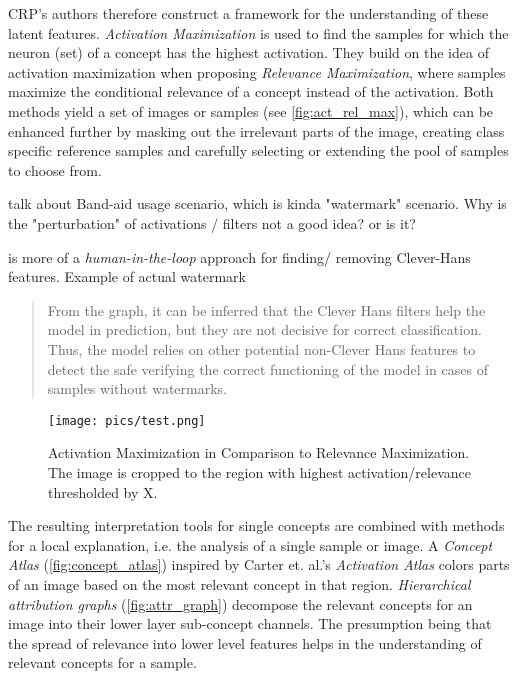 CRP's authors therefore construct a framework for the understanding of these latent features. \textit{Activation Maximization} is used to find the samples for which the neuron (set) of a concept has the highest activation. They build on the idea of activation maximization when proposing \textit{Relevance Maximization}, where samples maximize the conditional relevance of a concept instead of the activation. Both methods yield a set of images or samples (see \autoref{fig:act_rel_max}), which can be enhanced further by masking out the irrelevant parts of the image, creating class specific reference samples and carefully selecting or extending the pool of samples to choose from. 

talk about Band-aid usage scenario, which is kinda "watermark" scenario. Why is the "perturbation" of activations / filters not a good idea? or is it?

is more of a \textit{human-in-the-loop} approach for finding/ removing Clever-Hans features. Example of actual watermark
\begin{quote}
From the graph, it can be inferred that the Clever Hans filters help the model in prediction, but they are not decisive for correct classification. Thus, the model relies on other potential non-Clever Hans features to detect the safe verifying the correct functioning of the model in cases of samples without watermarks.
\end{quote}

\begin{figure}[htbp]
    \centering
	\texttt{[image: pics/test.png]}
    \caption{Activation Maximization in Comparison to Relevance Maximization. The image is cropped to the region with highest activation/relevance thresholded by X. }
    \label{fig:act_rel_max}
\end{figure}

The resulting interpretation tools for single concepts are combined with methods for a local explanation, i.e. the analysis of a single sample or image. A \textit{Concept Atlas} (\autoref{fig:concept_atlas}) inspired by Carter et. al.'s \textit{Activation Atlas}  colors parts of an image based on the most relevant concept in that region. \textit{Hierarchical attribution graphs} (\autoref{fig:attr_graph}) decompose the relevant concepts for an image into their lower layer sub-concept channels. The presumption being that the spread of relevance into lower level features helps in the understanding of relevant concepts for a sample.

